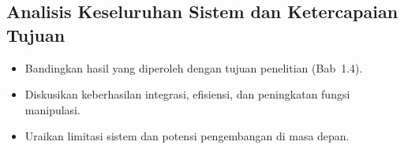 \subsection{Analisis Keseluruhan Sistem dan Ketercapaian Tujuan}
\begin{itemize}
    \item Bandingkan hasil yang diperoleh dengan tujuan penelitian (Bab~1.4).
    \item Diskusikan keberhasilan integrasi, efisiensi, dan peningkatan fungsi manipulasi.
    \item Uraikan limitasi sistem dan potensi pengembangan di masa depan.
\end{itemize}